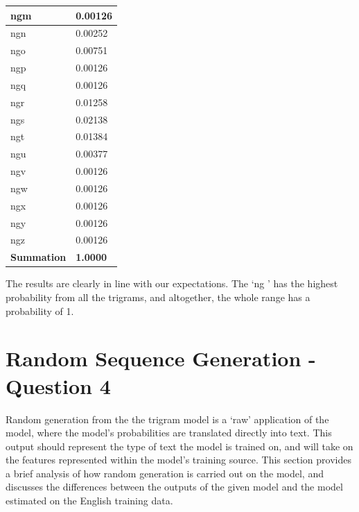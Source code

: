\documentclass[12pt]{article}
\begin{document}
\begin{center}
\begin{longtable}{ | C{5em} | C{6.5em} | }
	\hline
	 ngm  &   0.00126\\
	\hline
	
	
	\hline
	 ngn   &  0.00252\\
	\hline
	
	
	\hline
	 ngo   &  0.00751\\
	\hline
	
	
	\hline
	 ngp   &  0.00126\\
	\hline
	
	\hline
	 ngq   &  0.00126\\
	\hline
	
	\hline
	 ngr    & 0.01258\\
	\hline
	
	\hline
	 ngs   &  0.02138\\
	\hline
	
	\hline
	 ngt    & 0.01384\\
	\hline
	
	\hline
	 ngu    & 0.00377\\
	\hline
	
	
	\hline
	 ngv     & 0.00126\\
	\hline
	
	\hline
	 ngw    & 0.00126\\
	\hline
	
	
	\hline
	 ngx    & 0.00126\\
	\hline
	
	\hline
	 ngy    & 0.00126\\
	\hline
	
	\hline
	 ngz    & 0.00126\\
	\hline
	
	\hline
	 \textbf{Summation}   &  \textbf{1.0000}\\
	\hline
\end{longtable}
\end{center}
The results are clearly in line with our expectations.  The `ng ' has the highest probability from all the trigrams, and altogether, the whole range has a probability of 1.
\section{Random Sequence Generation - Question 4}
Random generation from the the trigram model is a `raw' application of the model, where the model's probabilities are translated directly into text.  This output should represent the type of text the model is trained on, and will  take on the features represented within the model's training source.  This section provides a brief analysis of how random generation is carried out on the model, and discusses the differences between the outputs of the given model and the model estimated on the English training data.
\end{document}
